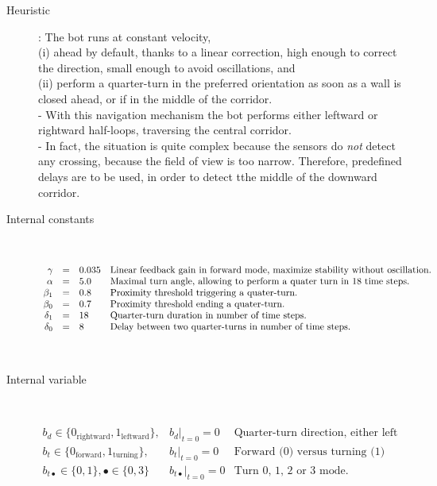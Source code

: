 \documentclass[a4]{article} \usepackage[left=2cm,right=3cm,top=1cm,bottom=2cm]{geometry}
\newcommand{\eqline}[1]{~\vspace{0.1cm}\\\centerline{$#1$}\vspace{0.1cm}\\}
\newcommand{\tab}{\hphantom{4mm}}
\begin{document}
\begin{description}
\item[Heuristic]: The bot runs at constant velocity,
\\\tab (i) ahead by default, thanks to a linear correction, high enough to correct the direction, small enough to avoid oscillations, and
\\\tab (ii) perform a quarter-turn in the preferred orientation as soon as a wall is closed ahead, or if in the middle of the corridor.
\\- With this navigation mechanism the bot performs either leftward or rightward half-loops, traversing the central corridor.
\\- In fact, the situation is quite complex because the sensors do {\em not} detect any crossing, because the field of view is too narrow. Therefore, predefined delays are to be used, in order to detect tthe middle of the downward corridor.
\item[Internal constants]  \eqline{\begin{array}{rcll}
    \gamma &=& 0.035 & \mbox{\parbox{12cm}{Linear feedback gain in forward mode, maximize stability without oscillation.}} \\
    \alpha    &=& 5.0 & \mbox{\parbox{12cm}{Maximal turn angle, allowing to perform a quater turn in $18$ time steps.}} \\
    \beta_1   &=& 0.8 & \mbox{\parbox{12cm}{Proximity threshold triggering a quater-turn.}} \\
    \beta_0   &=& 0.7 & \mbox{\parbox{12cm}{Proximity threshold ending a quater-turn.}} \\
    \delta _1   &=& 18 & \mbox{\parbox{12cm}{Quarter-turn duration in number of time steps.}} \\
    \delta _0   &=& 8 & \mbox{\parbox{12cm}{Delay between two quarter-turns in number of time steps.}} \\
\end{array}}
\item[Internal variable]  \eqline{\begin{array}{rcll}
  b_d \in \{0_{\mbox{rightward}}, 1_{\mbox{leftward}}\}, &\left.b_d\right|_{t = 0} = 0 & \mbox{Quarter-turn direction, either left (1) or right (0).} \\
  b_t \in \{0_{\mbox{forward}}, 1_{\mbox{turning}}\}, &\left.b_t\right|_{t = 0} = 0 & \mbox{Forward (0) versus turning (1) mode.} \\
  b_{t\bullet} \in \{0, 1\}, \bullet \in \{0, 3\}&\left.b_{t\bullet}\right|_{t = 0} = 0 & \mbox{Turn 0, 1, 2 or 3 mode.} \\

\end{array}}
\end{description}
\end{document}
